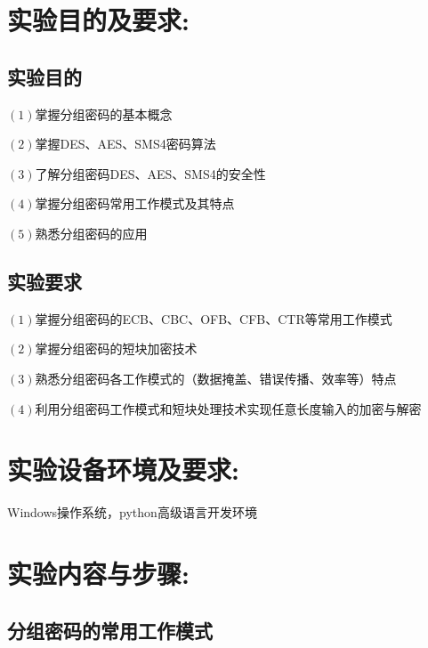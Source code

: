 \documentclass[a4paper,11pt,UTF8]{ctexart}
\begin{document}
\section{实验目的及要求:}
    \subsection{实验目的}
        $(1)$掌握分组密码的基本概念\par
        $(2)$掌握DES、AES、SMS4密码算法\par
        $(3)$了解分组密码DES、AES、SMS4的安全性\par
        $(4)$掌握分组密码常用工作模式及其特点\par
        $(5)$熟悉分组密码的应用\par
    \subsection{实验要求}
        $(1)$掌握分组密码的ECB、CBC、OFB、CFB、CTR等常用工作模式\par
        $(2)$掌握分组密码的短块加密技术\par
        $(3)$熟悉分组密码各工作模式的（数据掩盖、错误传播、效率等）特点\par
        $(4)$利用分组密码工作模式和短块处理技术实现任意长度输入的加密与解密\par
  

\section{实验设备环境及要求:}
    Windows操作系统，python高级语言开发环境
\newpage
\section{实验内容与步骤:}
    \subsection{分组密码的常用工作模式}
\end{document}
